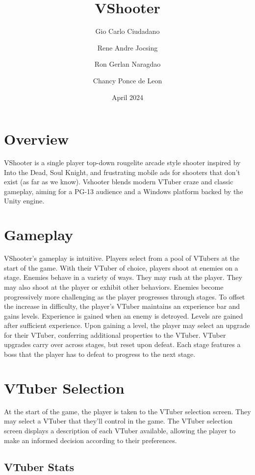 \documentclass[10pt, a4paper]{article}
\title{\textbf{VShooter}}
\author{Gio Carlo Ciudadano \and Rene Andre Jocsing \and Ron Gerlan Naragdao \and Chancy Ponce de Leon}
\date{April 2024}
\begin{document}
\maketitle


\twocolumn

	\section{Overview}

	VShooter is a single player top-down rougelite arcade style shooter inspired by Into the Dead, Soul Knight, and frustrating mobile ads for shooters that don't exist (as far as we know). Vshooter blends modern VTuber craze and classic gameplay, aiming for a PG-13 audience and a Windows platform backed by the Unity engine.

  	\section{Gameplay}

	VShooter's gameplay is intuitive. Players select from a pool of VTubers at the start of the game. With their VTuber of choice, players shoot at enemies on a stage. Enemies behave in a variety of ways. They may rush at the player. They may also shoot at the player or exhibit other behaviors. Enemies become progressively more challenging as the player progresses through stages. To offset the increase in difficulty, the player's VTuber maintains an experience bar and gains levels. Experience is gained when an enemy is detroyed. Levels are gained after sufficient experience. Upon gaining a level, the player may select an upgrade for their VTuber, conferring additional properties to the VTuber. VTuber upgrades carry over across stages, but reset upon defeat. Each stage features a boss that the player has to defeat to progress to the next stage.

	\section{VTuber Selection}

	At the start of the game, the player is taken to the VTuber selection screen. They may select a VTuber that they'll control in the game. The VTuber selection screen displays a description of each VTuber available, allowing the player to make an informed decision according to their preferences.
  	
  	\subsection{VTuber Stats} \label{Player Stats}
  	
\end{document}
